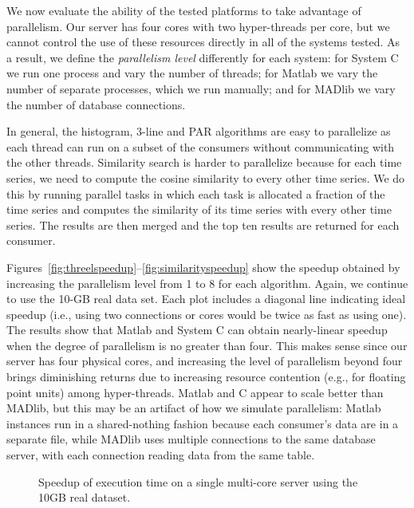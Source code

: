 \documentclass[prodmode,acmtods]{acmsmall}
\begin{document}
We now evaluate the ability of the tested platforms to take advantage of parallelism.  Our server has four cores with two hyper-threads per core, but we cannot control the use of these resources directly in all of the systems tested.  As a result, we define the \emph{parallelism level} differently for each system: for System C we run one process and vary the number of threads; for Matlab we vary the number of separate processes, which we run manually; and for MADlib we vary the number of database connections.

In general, the histogram, 3-line and PAR algorithms are easy to parallelize as each thread can run on a subset of the consumers without communicating with the other threads.  Similarity search is harder to parallelize because for each time series, we need to compute the cosine similarity to every other time series.  We do this by running parallel tasks in which each task is allocated a fraction of the time series and computes the similarity of its time series with every other time series.  The results are then merged and the top ten results are returned for each consumer.  

Figures~\ref{fig:threelspeedup}--\ref{fig:similarityspeedup} show the speedup obtained by increasing the parallelism level from 1 to 8 for each algorithm.  Again, we continue to use the 10-GB real data set.  Each plot includes a diagonal line indicating ideal speedup (i.e., using two connections or cores would be twice as fast as using one). The results show that Matlab and System C can obtain nearly-linear speedup when the degree of parallelism is no greater than four.  This makes sense since our server has four physical cores, and increasing the level of parallelism beyond four brings diminishing returns due to increasing resource contention (e.g., for floating point units) among hyper-threads.  Matlab and C appear to scale better than MADlib, but this may be an artifact of how we simulate parallelism: Matlab instances run in a shared-nothing fashion because each consumer's data are in a separate file, while MADlib uses multiple connections to the same database server, with each connection reading data from the same table.

\begin{figure*}[t]
 \centering
 \label{fig:speedup}
 \caption{Speedup of execution time on a single multi-core server using the 10GB real dataset.}
\end{figure*}
\end{document}
